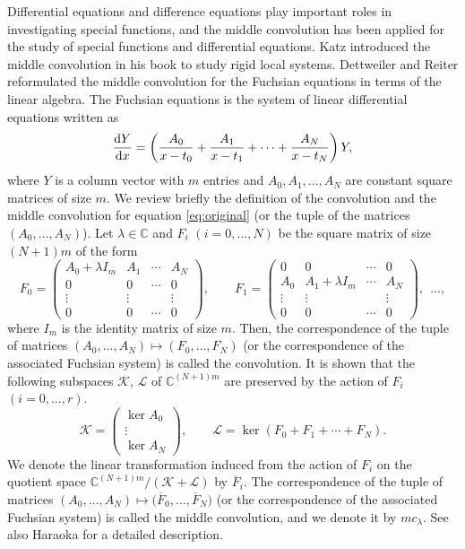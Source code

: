\documentclass[pdftex]{sigma}
\numberwithin{equation}{section}
\theoremstyle{definition}
\begin{document}
Differential equations and difference equations play important roles in investigating special functions, and the middle convolution has been applied for the study of special functions and differential equations.
Katz introduced the middle convolution in his book \cite{Katz} to study rigid local systems.
Dettweiler and Reiter \cite{DR1,DR2} reformulated the middle convolution for the Fuchsian equations in terms of the linear algebra.
The Fuchsian equations is the system of linear differential equations written as
\begin{equation}
\frac{{\rm d}Y}{{\rm d}x}=\left( \frac{A_0}{x-t_0}+\frac{A_1}{x-t_1} + \dots + \frac{A_N}{x-t_N} \right) Y, \label{eq:original}
\end{equation}
where $Y$ is a column vector with $m$ entries and $A_0, A_1, \dots ,A_N$ are constant square matrices of size $m$.
We review briefly the definition of the convolution and the middle convolution for equation \eqref{eq:original} (or the tuple of the matrices $(A_0, \dots ,A_N)$).
Let $\lambda \in \mathbb{C}$ and $F_i$ $(i=0,\dots ,N)$ be the square matrix of size $(N+1) m $ of the form
\begin{equation}
F_{0} =
\begin{pmatrix}
A_{0} + \lambda I_{m} & A_1 & \cdots & A_N \\
0 & 0 &\cdots & 0 \\
\vdots & \vdots & & \vdots \\
0 & 0 & \cdots & 0
\end{pmatrix}
, \qquad
F_{1} =
\begin{pmatrix}
0 & 0 & \cdots & 0 \\
A_{0} & A_1 + \lambda I_{m} & \cdots & A_N \\
\vdots & \vdots & & \vdots \\
0 & 0 & \cdots & 0
\end{pmatrix}
 ,  \ \ \dots ,
\label{eq:Fi}
\end{equation}
where $I_m $ is the identity matrix of size $m$.
Then, the correspondence of the tuple of matrices $(A_0, \dots ,A_N ) \mapsto (F_0 , \dots ,F_N )$ (or the correspondence of the associated Fuchsian system) is called the convolution.
It is shown that the following subspaces $\mathcal{K}$, $\mathcal{L}$ of $\mathbb{C}^{(N+1) m}$ are preserved by the action of $F_i$ $(i=0,\dots ,r)$.
\begin{equation*}
\mathcal{K} = \left(
\begin{matrix}
\operatorname{ker}A_{0} \\
\vdots \\
\operatorname{ker}A_{N}
\end{matrix}
\right), \qquad
\mathcal{L} = \operatorname{ker}(F_{0} + F_{1} + \cdots + F_{N}).
\end{equation*}
We denote the linear transformation induced from the action of $F_{i}$ on the quotient space $\mathbb{C}^{(N+1) m}/(\mathcal{K} + \mathcal{L})$ by $\overline{F}_{i}$.
The correspondence of the tuple of matrices $(A_0, \dots ,A_N ) \mapsto \bigl(\overline{F}_0 , \dots ,\allowbreak\overline{F}_N \bigr)$ (or the correspondence of the associated Fuchsian system) is called the middle convolution, and we denote it by $mc_{\lambda }$.
See also Haraoka \cite[Section~7.5]{Har} for a detailed description.
\end{document}
